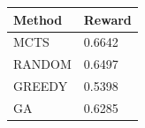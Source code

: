 \begin{tabular}{ll}
\hline
Method & Reward \\
\hline
  MCTS & 0.6642 \\
  RANDOM & 0.6497 \\
  GREEDY & 0.5398 \\
  GA & 0.6285 \\
\hline
\end{tabular}

